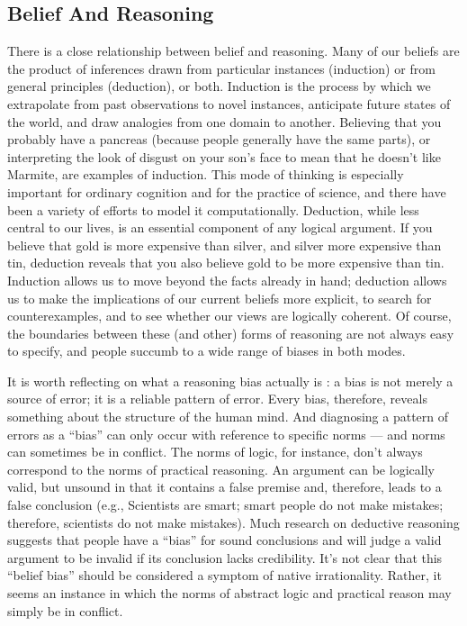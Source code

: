 \documentclass[a4paper,14pt]{extarticle}
\begin{document}
\subsection{Belief And Reasoning}

There is a close relationship between belief and reasoning.
Many of our beliefs are the product of inferences drawn from particular instances (induction) or from general principles (deduction), or both.
Induction is the process by which we extrapolate from past observations to novel instances, anticipate future states of the world, and draw analogies from one domain to another.
Believing that you probably have a pancreas (because people generally have the same parts), or interpreting the look of disgust on your son’s face to mean that he doesn’t like Marmite, are examples of induction.
This mode of thinking is especially important for ordinary cognition and for the practice of science, and there have been a variety of efforts to model it computationally.
Deduction, while less central to our lives, is an essential component of any logical argument.
If you believe that gold is more expensive than silver, and silver more expensive than tin, deduction reveals that you also believe gold to be more expensive than tin.
Induction allows us to move beyond the facts already in hand;
deduction allows us to make the implications of our current beliefs more explicit, to search for counterexamples, and to see whether our views are logically coherent.
Of course, the boundaries between these (and other) forms of reasoning are not always easy to specify, and people succumb to a wide range of biases in both modes.

It is worth reflecting on what a reasoning bias actually is :
a bias is not merely a source of error;
it is a reliable pattern of error.
Every bias, therefore, reveals something about the structure of the human mind.
And diagnosing a pattern of errors as a ``bias'' can only occur with reference to specific norms --- and norms can sometimes be in conflict.
The norms of logic, for instance, don’t always correspond to the norms of practical reasoning.
An argument can be logically valid, but unsound in that it contains a false premise and, therefore, leads to a false conclusion (e.g., Scientists are smart;
smart people do not make mistakes;
therefore, scientists do not make mistakes).
Much research on deductive reasoning suggests that people have a ``bias'' for sound conclusions and will judge a valid argument to be invalid if its conclusion lacks credibility.
It’s not clear that this ``belief bias'' should be considered a symptom of native irrationality.
Rather, it seems an instance in which the norms of abstract logic and practical reason may simply be in conflict.
\end{document}

